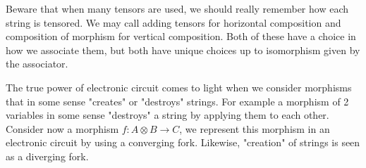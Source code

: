 \documentclass[../thesis.tex]{subfiles}
\begin{document}
            Beware that when many tensors are used, we should really remember how each string is tensored. We may call adding tensors for horizontal composition and composition of morphism for vertical composition. Both of these have a choice in how we associate them, but both have unique choices up to isomorphism given by the associator. 
            \begin{center}
            \end{center}

            The true power of electronic circuit comes to light when we consider morphisms that in some sense "creates" or "destroys" strings. For example a morphism of 2 variables in some sense "destroys" a string by applying them to each other. Consider now a morphism $f : A \otimes B \rightarrow C$, we represent this morphism in an electronic circuit by using a converging fork. Likewise, "creation" of strings is seen as a diverging fork.
            \begin{center}
            \end{center}
\end{document}
